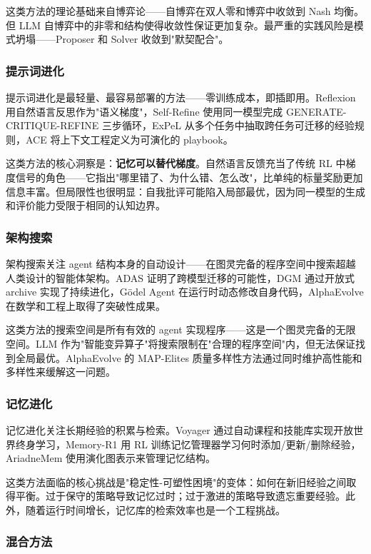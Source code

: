 这类方法的理论基础来自博弈论——自博弈在双人零和博弈中收敛到 Nash 均衡。但 LLM 自博弈中的非零和结构使得收敛性保证更加复杂。最严重的实践风险是模式坍塌——Proposer 和 Solver 收敛到"默契配合"。

\subsubsection{提示词进化}

提示词进化是最轻量、最容易部署的方法——零训练成本，即插即用。Reflexion 用自然语言反思作为"语义梯度"，Self-Refine 使用同一模型完成 GENERATE-CRITIQUE-REFINE 三步循环，ExPeL 从多个任务中抽取跨任务可迁移的经验规则，ACE 将上下文工程定义为可演化的 playbook。

这类方法的核心洞察是：\textbf{记忆可以替代梯度}。自然语言反馈充当了传统 RL 中梯度信号的角色——它指出"哪里错了、为什么错、怎么改"，比单纯的标量奖励更加信息丰富。但局限性也很明显：自我批评可能陷入局部最优，因为同一模型的生成和评价能力受限于相同的认知边界。

\subsubsection{架构搜索}

架构搜索关注 agent 结构本身的自动设计——在图灵完备的程序空间中搜索超越人类设计的智能体架构。ADAS 证明了跨模型迁移的可能性，DGM 通过开放式 archive 实现了持续进化，Gödel Agent 在运行时动态修改自身代码，AlphaEvolve 在数学和工程上取得了突破性成果。

这类方法的搜索空间是所有有效的 agent 实现程序——这是一个图灵完备的无限空间。LLM 作为"智能变异算子"将搜索限制在"合理的程序空间"内，但无法保证找到全局最优。AlphaEvolve 的 MAP-Elites 质量多样性方法通过同时维护高性能和多样性来缓解这一问题。

\subsubsection{记忆进化}

记忆进化关注长期经验的积累与检索。Voyager 通过自动课程和技能库实现开放世界终身学习，Memory-R1 用 RL 训练记忆管理器学习何时添加/更新/删除经验，AriadneMem 使用演化图表示来管理记忆结构。

这类方法面临的核心挑战是"稳定性-可塑性困境"的变体：如何在新旧经验之间取得平衡。过于保守的策略导致记忆过时；过于激进的策略导致遗忘重要经验。此外，随着运行时间增长，记忆库的检索效率也是一个工程挑战。

\subsubsection{混合方法}

